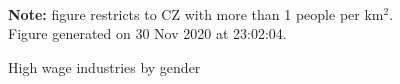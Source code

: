\begin{figure}[!h]
\centering
\caption{High wage industries by gender}
\label{fig:gender_ind_cities}
  \\ 
\par \begin{minipage}[h]{\textwidth}{\tiny\textbf{Note:} figure restricts to CZ with more than 1 people per km$^2$. Figure generated on 30 Nov 2020 at 23:02:04.}\end{minipage}
\end{figure}
